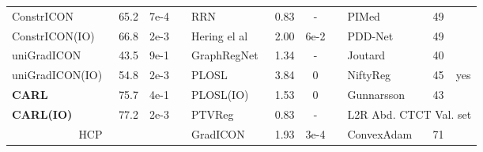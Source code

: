 \begin{table*}[htp]
\begin{adjustbox}{width=\textwidth,center}
\begin{tabular}{lccp{1em}lccp{1em}lcc}
			ConstrICON~\cite{greer2023inverse}                        & 65.2           & 7e-4                   & & RRN~\cite{he2021recursive}                              & 0.83             & -                                             & & PIMed~\cite{hering2022learn2reg}                              & 49             &                              \\
			ConstrICON(IO)~\cite{greer2023inverse}                    & 66.8           & 2e-3                   & & Hering el al~\cite{hering2021cnn}                       & 2.00             & 6e-2                                          & & PDD-Net~\cite{heinrich2019closing}                            & 49             &                              \\
			uniGradICON~\cite{tian2024unigradicon}                    & 43.5           & 9e-1                   & & GraphRegNet~\cite{hansen2021graphregnet}                & 1.34             & -                                             & & Joutard~\cite{hering2022learn2reg}                            & 40             &                              \\
			uniGradICON(IO)~\cite{tian2024unigradicon}                & 54.8              &    2e-3                   & & PLOSL~\cite{wang2022PLOSL}                              & 3.84             & 0                                             & & NiftyReg~\cite{modat2010fast}                                 & 45             & yes                             \\
			\textbf{CARL}                                             & 75.7           & 4e-1                   & & PLOSL(IO)~\cite{wang2022PLOSL}                          & 1.53             & 0                                             & & Gunnarsson~\cite{gunnarsson2020learning}                      & 43             &                              \\
			\textbf{CARL(IO)}                                         & 77.2           & 2e-3                   & & PTVReg~\cite{vishnevskiy2017isotropic}                  & 0.83             & -                                             & & \multicolumn{3}{c}{\cellcolor{blue!10}L2R Abd. CTCT Val. set}                                              \\
			\multicolumn{3}{c}{\cellcolor[RGB]{208,234,208}HCP}                                                 & & GradICON~\cite{tian2022}                                & 1.93             & 3e-4                                          & & ConvexAdam~\cite{siebert2021fast}                             & 71                                              \\

\end{tabular}
\end{adjustbox}
\end{table*}
